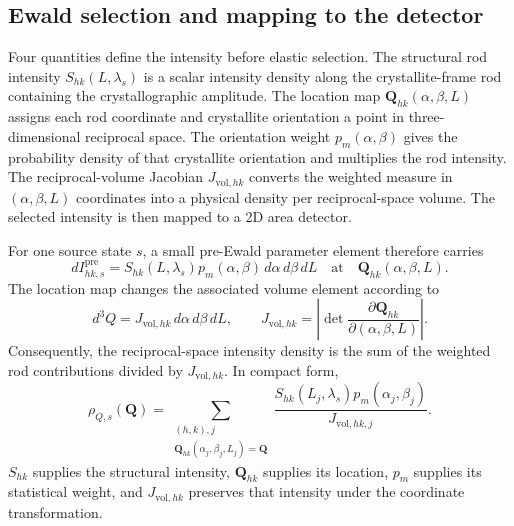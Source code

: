 \subsection{Ewald selection and mapping to the detector}
\label{sec:correlated_effects}
\label{sec:refraction}
\label{sec:bandwidth_mosaic_cap}
\label{sec:detector_mapping}

Four quantities define the intensity before elastic selection. The structural rod intensity $S_{hk}(L,\lambda_s)$ is a scalar intensity density along the crystallite-frame rod containing the crystallographic amplitude. The location map $\mathbf Q_{hk}(\alpha,\beta,L)$ assigns each rod coordinate and crystallite orientation a point in three-dimensional reciprocal space. The orientation weight $p_m(\alpha,\beta)$ gives the probability density of that crystallite orientation and multiplies the rod intensity. The reciprocal-volume Jacobian $J_{\mathrm{vol},hk}$ converts the weighted measure in $(\alpha,\beta,L)$ coordinates into a physical density per reciprocal-space volume. The selected intensity is then mapped to a 2D area detector.

For one source state $s$, a small pre-Ewald parameter element therefore carries
\begin{equation}
  dI^{\mathrm{pre}}_{hk,s}
  =S_{hk}(L,\lambda_s)p_m(\alpha,\beta)
   \,d\alpha\,d\beta\,dL
  \quad\text{at}\quad
  \mathbf Q_{hk}(\alpha,\beta,L).
  \label{eq:pre_ewald_measure_main}
\end{equation}
The location map changes the associated volume element according to
\begin{equation}
  d^3Q
  =J_{\mathrm{vol},hk}\,d\alpha\,d\beta\,dL,
  \qquad
  J_{\mathrm{vol},hk}
  =\left|\det\frac{\partial\mathbf Q_{hk}}
  {\partial(\alpha,\beta,L)}\right|.
  \label{eq:reciprocal_volume_measure_main}
\end{equation}
Consequently, the reciprocal-space intensity density is the sum of the weighted rod contributions divided by $J_{\mathrm{vol},hk}$. In compact form,
\begin{equation}
  \rho_{Q,s}(\mathbf Q)
  =\sum_{\substack{(h,k),j\\
  \mathbf Q_{hk}(\alpha_j,\beta_j,L_j)=\mathbf Q}}
  \frac{S_{hk}(L_j,\lambda_s)
  p_m(\alpha_j,\beta_j)}{J_{\mathrm{vol},hk,j}}.
  \label{eq:pre_ewald_reciprocal_density_main}
\end{equation}
$S_{hk}$ supplies the structural intensity, $\mathbf Q_{hk}$ supplies its location, $p_m$ supplies its statistical weight, and $J_{\mathrm{vol},hk}$ preserves that intensity under the coordinate transformation.

